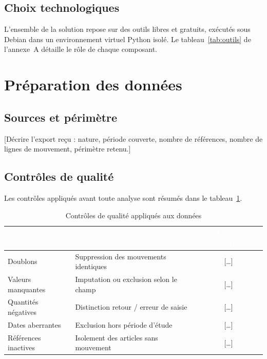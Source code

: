 \subsection{Choix technologiques}

L'ensemble de la solution repose sur des outils libres et gratuits, exécutés
sous Debian dans un environnement virtuel Python isolé. Le
tableau~\ref{tab:outils} de l'annexe~A détaille le rôle de chaque composant.


\section{Préparation des données}
\label{sec:preparation}

\subsection{Sources et périmètre}

\hspace{1cm}[Décrire l'export reçu : nature, période couverte, nombre de
références, nombre de lignes de mouvement, périmètre retenu.]

\subsection{Contrôles de qualité}

Les contrôles appliqués avant toute analyse sont résumés dans le
tableau~\ref{tab:controles}.

\begin{table}[H]
  \centering
  \caption{Contrôles de qualité appliqués aux données}
  \label{tab:controles}
  \renewcommand{\arraystretch}{1.4}
  \begin{tabularx}{\textwidth}{|l|X|c|}
    \hline
    \rowcolor{iacsTableHead}
    \textcolor{white}{\textbf{Contrôle}} &
    \textcolor{white}{\textbf{Traitement appliqué}} &
    \textcolor{white}{\textbf{Lignes concernées}} \\
    \hline
    Doublons            & Suppression des mouvements identiques        & [\ldots] \\
    \hline
    \rowcolor{iacsLightGray}
    Valeurs manquantes  & Imputation ou exclusion selon le champ       & [\ldots] \\
    \hline
    Quantités négatives & Distinction retour / erreur de saisie        & [\ldots] \\
    \hline
    \rowcolor{iacsLightGray}
    Dates aberrantes    & Exclusion hors période d'étude               & [\ldots] \\
    \hline
    Références inactives& Isolement des articles sans mouvement        & [\ldots] \\
    \hline
  \end{tabularx}
\end{table}

